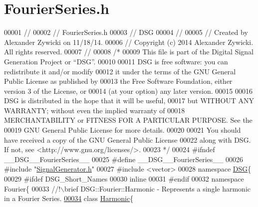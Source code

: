 \hypertarget{_fourier_series_8h_source}{\section{Fourier\+Series.\+h}
\label{_fourier_series_8h_source}
}

\begin{DoxyCode}
00001 \textcolor{comment}{//}
00002 \textcolor{comment}{//  FourierSeries.h}
00003 \textcolor{comment}{//  DSG}
00004 \textcolor{comment}{//}
00005 \textcolor{comment}{//  Created by Alexander Zywicki on 11/18/14.}
00006 \textcolor{comment}{//  Copyright (c) 2014 Alexander Zywicki. All rights reserved.}
00007 \textcolor{comment}{//}
00008 \textcolor{comment}{/*}
00009 \textcolor{comment}{ This file is part of the Digital Signal Generation Project or “DSG”.}
00010 \textcolor{comment}{}
00011 \textcolor{comment}{ DSG is free software: you can redistribute it and/or modify}
00012 \textcolor{comment}{ it under the terms of the GNU General Public License as published by}
00013 \textcolor{comment}{ the Free Software Foundation, either version 3 of the License, or}
00014 \textcolor{comment}{ (at your option) any later version.}
00015 \textcolor{comment}{}
00016 \textcolor{comment}{ DSG is distributed in the hope that it will be useful,}
00017 \textcolor{comment}{ but WITHOUT ANY WARRANTY; without even the implied warranty of}
00018 \textcolor{comment}{ MERCHANTABILITY or FITNESS FOR A PARTICULAR PURPOSE.  See the}
00019 \textcolor{comment}{ GNU General Public License for more details.}
00020 \textcolor{comment}{}
00021 \textcolor{comment}{ You should have received a copy of the GNU General Public License}
00022 \textcolor{comment}{ along with DSG.  If not, see <http://www.gnu.org/licenses/>.}
00023 \textcolor{comment}{ */}
00024 \textcolor{preprocessor}{#ifndef \_\_DSG\_\_FourierSeries\_\_}
00025 \textcolor{preprocessor}{#define \_\_DSG\_\_FourierSeries\_\_}
00026 \textcolor{preprocessor}{#include "\hyperlink{_signal_generator_8h}{SignalGenerator.h}"}
00027 \textcolor{preprocessor}{#include <vector>}
00028 \textcolor{keyword}{namespace }\hyperlink{namespace_d_s_g}{DSG}\{
00029 \textcolor{preprocessor}{#ifdef DSG\_Short\_Names}
00030     \textcolor{keyword}{inline}
00031 \textcolor{preprocessor}{#endif}
00032     \textcolor{keyword}{namespace }Fourier\{\textcolor{comment}{}
00033 \textcolor{comment}{        //!\(\backslash\)brief DSG::Fourier::Harmonic - Represents a single harmonic in a Fourier Series.}
\hypertarget{_fourier_series_8h_source_l00034}{}\hyperlink{class_d_s_g_1_1_fourier_1_1_harmonic}{00034} \textcolor{comment}{}        \textcolor{keyword}{class }\hyperlink{class_d_s_g_1_1_fourier_1_1_harmonic}{Harmonic}\{

\end{DoxyCode}
